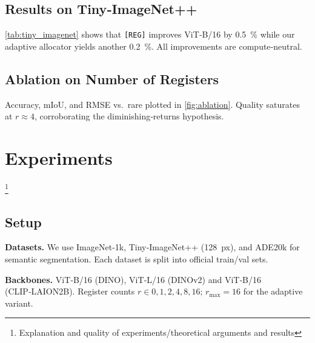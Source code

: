 \documentclass{article}
\newcommand{\RegTok}{\texttt{[REG]}\xspace}
\newcommand{\nreg}{r}
\begin{document}
\subsection{Results on Tiny‑ImageNet++}
\cref{tab:tiny_imagenet} shows that \RegTok improves ViT‑B/16 by \SI{0.5}{\percent} while our adaptive allocator yields another \SI{0.2}{\percent}.  All improvements are compute‑neutral.


\subsection{Ablation on Number of Registers}
Accuracy, mIoU, and RMSE vs. \nreg are plotted in \cref{fig:ablation}.  Quality saturates at $\nreg\approx4$, corroborating the diminishing‑returns hypothesis.


\section{Experiments}
\label{sec:experiments}
\footnote{Explanation and quality of experiments/theoretical arguments and results}
\subsection{Setup}
\textbf{Datasets.}  We use ImageNet‑1k, Tiny‑ImageNet++ (\SI{128}{px}), and ADE20k for semantic segmentation.  Each dataset is split into official train/val sets.

\textbf{Backbones.}  ViT‑B/16 (DINO), ViT‑L/16 (DINOv2) and ViT‑B/16 (CLIP‑LAION2B).  Register counts $\nreg\in{0,1,2,4,8,16}$; $\nreg_{\max}=16$ for the adaptive variant.
\end{document}
